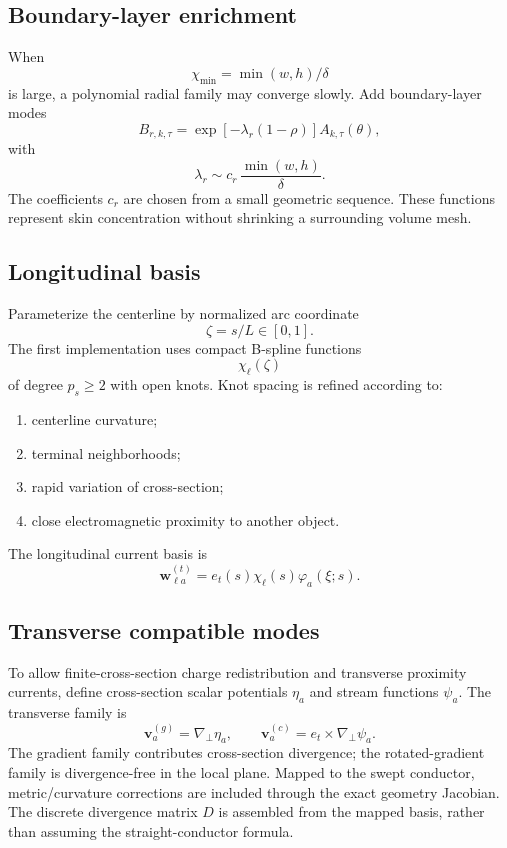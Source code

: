 \subsection{Boundary-layer enrichment}

When
\[
 \chi_{\min}
 =
 \min(w,h)/\delta
\]
is large, a polynomial radial family may converge slowly. Add boundary-layer
modes
\[
 B_{r,k,\tau}
 =
 \exp[-\lambda_r(1-\rho)]
 A_{k,\tau}(\theta),
\]
with
\[
 \lambda_r
 \sim
 c_r\,\frac{\min(w,h)}{\delta}.
\]
The coefficients $c_r$ are chosen from a small geometric sequence. These
functions represent skin concentration without shrinking a surrounding volume
mesh.

\subsection{Longitudinal basis}

Parameterize the centerline by normalized arc coordinate
\[
 \zeta=s/L\in[0,1].
\]
The first implementation uses compact B-spline functions
\[
 \chi_\ell(\zeta)
\]
of degree $p_s\ge2$ with open knots. Knot spacing is refined according to:
\begin{enumerate}
\item centerline curvature;
\item terminal neighborhoods;
\item rapid variation of cross-section;
\item close electromagnetic proximity to another object.
\end{enumerate}

The longitudinal current basis is
\[
 \mathbf w_{\ell a}^{(t)}
 =
 e_t(s)\chi_\ell(s)\varphi_a(\xi;s).
\]

\subsection{Transverse compatible modes}

To allow finite-cross-section charge redistribution and transverse proximity
currents, define cross-section scalar potentials $\eta_a$ and stream functions
$\psi_a$. The transverse family is
\[
 \mathbf v_a^{(g)}
 =
 \nabla_\perp \eta_a,
\qquad
 \mathbf v_a^{(c)}
 =
 e_t\times\nabla_\perp\psi_a.
\]
The gradient family contributes cross-section divergence; the rotated-gradient
family is divergence-free in the local plane. Mapped to the swept conductor,
metric/curvature corrections are included through the exact geometry
Jacobian. The discrete divergence matrix $D$ is assembled from the mapped
basis, rather than assuming the straight-conductor formula.


